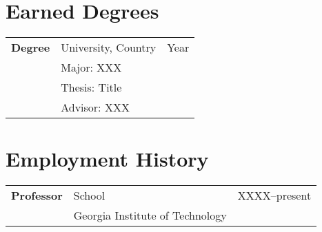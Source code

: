 \section{Earned Degrees}
\label{sec:educational}

\begin{tabular}{p{}p{}r}
\textbf{Degree} & University, Country & {Year}\\
                & Major: XXX& \\
                & Thesis: Title&\\
                & Advisor: XXX &\\
\end{tabular}


\section{Employment History}
\label{sec:employment}

\begin{tabular}{p{}p{}r}
    \textbf{Professor}  & School & {XXXX--present}\\
                        & Georgia Institute of Technology & \\
\end{tabular}


